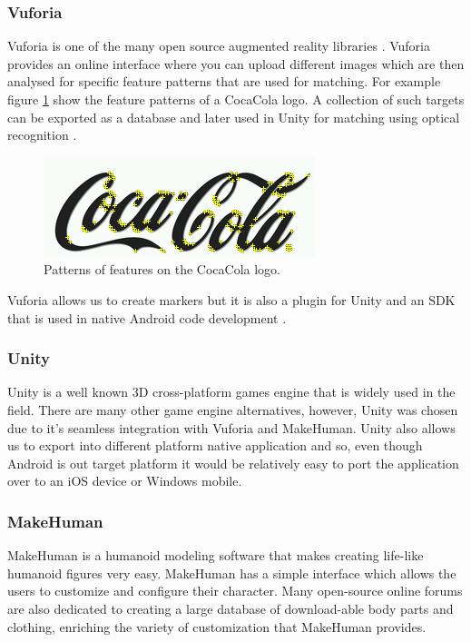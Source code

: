 \documentclass{l4proj}
\begin{document}
\subsubsection{Vuforia}
Vuforia is one of the many open source augmented reality libraries \cite{vuforia_getting_2016}. Vuforia provides an online interface where you can upload different images which are then analysed for specific feature patterns that are used for matching. For example figure \ref{fig:coca_cola_features} show the feature patterns of a CocaCola logo. A collection of such targets can be exported as a database and later used in Unity for matching using optical recognition \cite{rao_how_2015}.
\begin{figure}
\centering
\includegraphics[scale=1]{images/coca_cola_features.png}
\caption{Patterns of features on the CocaCola logo.}
\label{fig:coca_cola_features}
\end{figure}

Vuforia allows us to create markers but it is also a plugin for Unity and an SDK that is used in native Android code development \cite{rao_how_2015}.

\subsubsection{Unity}
Unity is a well known 3D cross-platform games engine that is widely used in the field. There are many other game engine alternatives, however, Unity was chosen due to it's seamless integration with Vuforia and MakeHuman. Unity also allows us to export into different platform native application and so, even though Android is out target platform it would be relatively easy to port the application over to an iOS device or Windows mobile. 

\subsubsection{MakeHuman}
MakeHuman is a humanoid modeling software that makes creating life-like humanoid	 figures very easy. MakeHuman has a simple interface which allows the users to customize and configure their character. Many open-source online forums are also dedicated to creating a large database of download-able body parts and clothing, enriching the variety of customization that MakeHuman provides.
\end{document}
